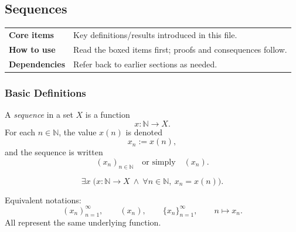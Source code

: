 
\subsection{Sequences}

\begin{tcolorbox}[colback=gray!6, colframe=gray!40, arc=2pt,
  left=6pt, right=6pt, top=4pt, bottom=4pt,
  title={\small\textbf{Sequences — Quick Reference}},
  fonttitle=\small\bfseries]
\begin{tabular}{@{}p{}p{}@{}}
\textbf{Core items} & Key definitions/results introduced in this file.\\
\textbf{How to use} & Read the boxed items first; proofs and consequences follow.\\
\textbf{Dependencies} & Refer back to earlier sections as needed.\\
\end{tabular}
\end{tcolorbox}


\subsubsection{Basic Definitions}

\begin{tcolorbox}[colback=propbox, colframe=propborder, arc=2pt,
  left=6pt, right=6pt, top=4pt, bottom=4pt,
  title={\small\textbf{Definition (Sequence)}},
  fonttitle=\small\bfseries]
A \emph{sequence} in a set $X$ is a function
\[
x : \mathbb{N} \to X.
\]
For each $n\in\mathbb{N}$, the value $x(n)$ is denoted
\[
x_n := x(n),
\]
and the sequence is written
\[
(x_n)_{n\in\mathbb{N}}
\quad\text{or simply}\quad
(x_n).
\]
\end{tcolorbox}

\begin{remark}
\[
\exists x\;
\bigl(
x:\mathbb{N}\to X
\ \wedge\
\forall n\in\mathbb{N},\ x_n = x(n)
\bigr).
\]
\end{remark}

\begin{remark}
Equivalent notations:
\[
(x_n)_{n=1}^{\infty},
\qquad
(x_n),
\qquad
\{x_n\}_{n=1}^{\infty},
\qquad
n \mapsto x_n.
\]
All represent the same underlying function.
\end{remark}


